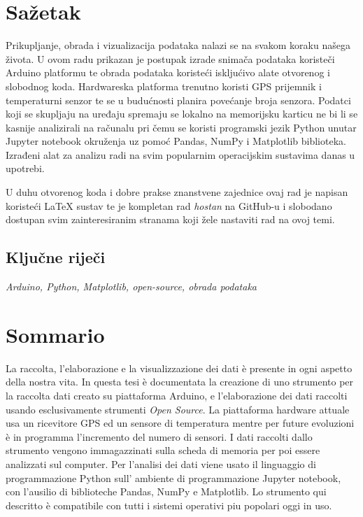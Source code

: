 \section*{Sažetak}\label{sazetak_hr}
Prikupljanje, obrada i vizualizacija podataka nalazi se na svakom koraku našega života.
U ovom radu prikazan je postupak izrade snimača podataka koristeči Arduino platformu te obrada podataka koristeći iskljućivo alate otvorenog i slobodnog koda.
Hardwareska platforma trenutno koristi GPS prijemnik i temperaturni senzor te se u budućnosti planira povećanje broja senzora.
Podatci koji se skupljaju na uređaju spremaju se lokalno na memorijsku karticu ne bi li se kasnije analizirali na računalu pri čemu se koristi programski jezik Python unutar Jupyter notebook okruženja uz pomoć Pandas, NumPy i Matplotlib biblioteka.
Izrađeni alat za analizu radi na svim popularnim operacijskim sustavima danas u upotrebi.

U duhu otvorenog koda i dobre prakse znanstvene zajednice ovaj rad je napisan koristeći \LaTeX{} sustav te je kompletan rad \textit{hostan} na GitHub-u i slobodano dostupan svim zainteresiranim stranama koji žele nastaviti rad na ovoj temi.

\subsection*{Ključne riječi}\label{kw_hr}
\textit{Arduino, Python, Matplotlib, open-source, obrada podataka}

\section*{Sommario}\label{sazetak_it}
La raccolta, l’elaborazione e la visualizzazione dei dati è presente in ogni aspetto della nostra
vita.
In questa tesi è documentata la creazione di uno strumento per la raccolta dati creato su
piattaforma Arduino, e l’elaborazione dei dati raccolti usando esclusivamente strumenti \textit{Open Source}.
La piattaforma hardware attuale usa un ricevitore GPS ed un sensore di temperatura mentre per future evoluzioni è in programma l’incremento del numero di sensori. 
I dati raccolti dallo strumento vengono immagazzinati sulla scheda di memoria per poi essere analizzati sul computer.
Per l’analisi dei dati viene usato il linguaggio di programmazione Python sull' ambiente di programmazione Jupyter notebook, con l’ausilio di biblioteche Pandas, NumPy e Matplotlib.
Lo strumento qui descritto è compatibile con tutti i sistemi operativi piu popolari oggi in uso.

